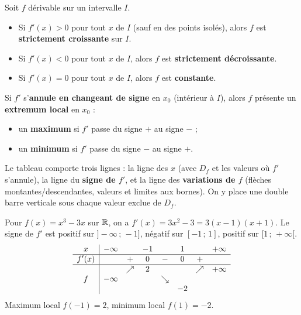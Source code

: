 \begin{theoreme}
Soit $f$ dérivable sur un intervalle $I$.
\begin{itemize}
  \item Si $f'(x)>0$ pour tout $x$ de $I$ (sauf en des points isolés), alors $f$ est
        \textbf{strictement croissante} sur $I$.
  \item Si $f'(x)<0$ pour tout $x$ de $I$, alors $f$ est \textbf{strictement décroissante}.
  \item Si $f'(x)=0$ pour tout $x$ de $I$, alors $f$ est \textbf{constante}.
\end{itemize}
\end{theoreme}

\begin{propriete}
Si $f'$ s'\textbf{annule en changeant de signe} en $x_0$ (intérieur à $I$), alors $f$
présente un \textbf{extremum local} en $x_0$ :
\begin{itemize}
  \item un \textbf{maximum} si $f'$ passe du signe $+$ au signe $-$ ;
  \item un \textbf{minimum} si $f'$ passe du signe $-$ au signe $+$.
\end{itemize}
\end{propriete}

\begin{aretenir}
Le tableau comporte trois lignes : la ligne des $x$ (avec $D_f$ et les valeurs où $f'$
s'annule), la ligne du \textbf{signe de $f'$}, et la ligne des \textbf{variations de $f$}
(flèches montantes/descendantes, valeurs et limites aux bornes). On y place une double
barre verticale sous chaque valeur exclue de $D_f$.
\end{aretenir}

\begin{exemple}
Pour $f(x)=x^3-3x$ sur $\mathbb{R}$, on a $f'(x)=3x^2-3=3(x-1)(x+1)$. Le signe de $f'$ est
positif sur $]-\infty\,;\,-1]$, négatif sur $[-1\,;\,1]$, positif sur $[1\,;\,+\infty[$.
\[
\begin{array}{c|ccccccc}
x        & -\infty &        & -1 &        & 1 &        & +\infty \\ \hline
f'(x)    &         & +      & 0  & -      & 0 & +      &         \\ \hline
         &         & \nearrow & 2 &        &   & \nearrow & +\infty \\
f        &-\infty  &        &    & \searrow & &        &         \\
         &         &        &    &        & -2 &       &
\end{array}
\]
Maximum local $f(-1)=2$, minimum local $f(1)=-2$.
\end{exemple}

